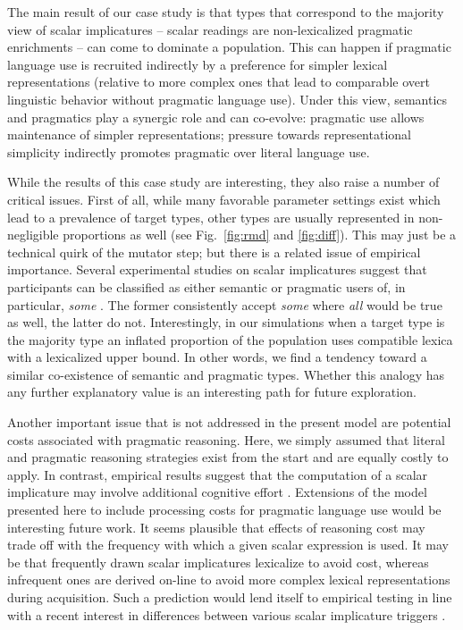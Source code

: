 \documentclass[a4paper, 11pt]{article}
\theoremstyle{Satz}
\begin{document}
The main result of our case study is that types that correspond to the majority view of scalar
implicatures -- scalar readings are non-lexicalized pragmatic enrichments -- can come to
dominate a population. This can happen if pragmatic language use is recruited indirectly by a
preference for simpler lexical representations (relative to more complex ones that lead to
comparable overt linguistic behavior without pragmatic language use). Under this view,
semantics and pragmatics play a synergic role and can co-evolve: pragmatic use allows
maintenance of simpler representations; pressure towards representational simplicity indirectly
promotes pragmatic over literal language use. 

While the results of this case study are interesting, they also raise a number of critical
issues. First of all, while many favorable parameter settings exist which lead to a prevalence
of target types, other types are usually represented in non-negligible proportions as well (see
Fig.~\ref{fig:rmd} and \ref{fig:diff}). This may just be a technical quirk of the mutator step;
but there is a related issue of empirical importance. Several experimental studies on scalar
implicatures suggest that participants can be classified as either semantic or pragmatic users
of, in particular, \emph{some}
\citep[e.g.,][]{BottNoveck2004:Some-Utterances,NieuwlandDitman2010:On-the-incremen,DegenTanenhaus2012:Processing-Scal}. The
former consistently accept \emph{some} where \emph{all} would be true as well, the latter do
not. Interestingly, in our simulations when a target type is the majority type an inflated
proportion of the population uses compatible lexica with a lexicalized upper bound. In other
words, we find a tendency toward a similar co-existence of semantic and pragmatic
types. Whether this analogy has any further explanatory value is an interesting path for future
exploration.

Another important issue that is not addressed in the present model are potential costs associated with
pragmatic reasoning. Here, we simply assumed that literal and pragmatic reasoning strategies
exist from the start and are equally costly to apply. In contrast, empirical results suggest
that the computation of a scalar implicature may involve additional cognitive effort
\citep[e.g.,][]{BrehenyKatsos2006:Are-Generalised,deNeys+schaeken:2007,huang+snedeker:2009,Jr.Bailey2013:Possibly-all-of}. Extensions
of the model presented here to include processing costs for pragmatic language use would be
interesting future work. It seems plausible that effects of reasoning cost may trade off with
the frequency with which a given scalar expression is used. It may be that frequently drawn
scalar implicatures lexicalize to avoid cost, whereas infrequent ones are derived on-line to
avoid more complex lexical representations during acquisition. Such a prediction would lend itself to
empirical testing in line with a recent interest in differences between various scalar
implicature triggers \citep{Tielvan-TielMiltenburgvan-Miltenburg2014:Scalar-Diversit}. 
\end{document}
